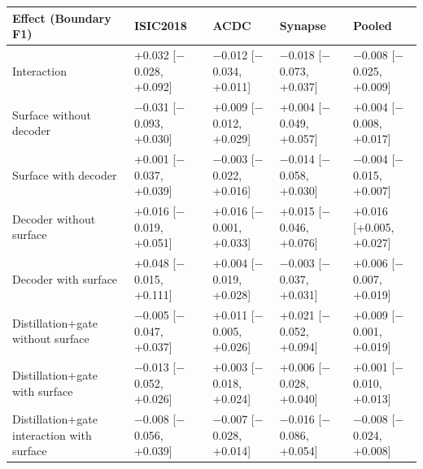\begin{tabular}{lllll}
\toprule
Effect (Boundary F1) & ISIC2018 & ACDC & Synapse & Pooled \\
\midrule
Interaction & +0.032 [$-$0.028, +0.092] & $-$0.012 [$-$0.034, +0.011] & $-$0.018 [$-$0.073, +0.037] & $-$0.008 [$-$0.025, +0.009] \\
Surface without decoder & $-$0.031 [$-$0.093, +0.030] & +0.009 [$-$0.012, +0.029] & +0.004 [$-$0.049, +0.057] & +0.004 [$-$0.008, +0.017] \\
Surface with decoder & +0.001 [$-$0.037, +0.039] & $-$0.003 [$-$0.022, +0.016] & $-$0.014 [$-$0.058, +0.030] & $-$0.004 [$-$0.015, +0.007] \\
Decoder without surface & +0.016 [$-$0.019, +0.051] & +0.016 [$-$0.001, +0.033] & +0.015 [$-$0.046, +0.076] & +0.016 [+0.005, +0.027] \\
Decoder with surface & +0.048 [$-$0.015, +0.111] & +0.004 [$-$0.019, +0.028] & $-$0.003 [$-$0.037, +0.031] & +0.006 [$-$0.007, +0.019] \\
Distillation+gate without surface & $-$0.005 [$-$0.047, +0.037] & +0.011 [$-$0.005, +0.026] & +0.021 [$-$0.052, +0.094] & +0.009 [$-$0.001, +0.019] \\
Distillation+gate with surface & $-$0.013 [$-$0.052, +0.026] & +0.003 [$-$0.018, +0.024] & +0.006 [$-$0.028, +0.040] & +0.001 [$-$0.010, +0.013] \\
Distillation+gate interaction with surface & $-$0.008 [$-$0.056, +0.039] & $-$0.007 [$-$0.028, +0.014] & $-$0.016 [$-$0.086, +0.054] & $-$0.008 [$-$0.024, +0.008] \\
\bottomrule
\end{tabular}
